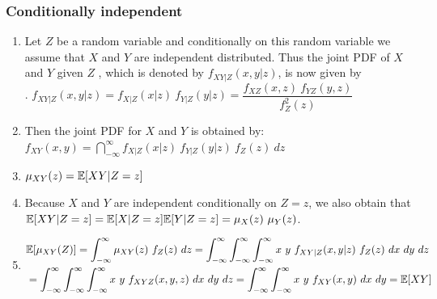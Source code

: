 \subsubsection{Conditionally independent}

\begin{enumerate}
    \item Let $Z$ be a random variable and conditionally on this random variable we assume that $X$ and $Y$ are independent distributed.
    Thus the joint PDF of $X$ and $Y$ given $Z$ , which is denoted by $f _{X Y |Z} (x, y|z)$, is now given by
    \hfill \cite{statistics/book/Statistics-for-Data-Scientists/Maurits-Kaptein}
    \\
    .\hfill
    $
        f_{X Y |Z} (x, y|z)
        = f _{X|Z} (x|z)\ f_{Y |Z} (y|z)
        = \dfrac{f_{X Z} (x, z)\ f_{Y Z} (y, z) } {f^2_Z (z)}
    $
    \hfill \cite{statistics/book/Statistics-for-Data-Scientists/Maurits-Kaptein}

    \item Then the joint PDF for $X$ and $Y$ is obtained by:
    $
        f _{X Y} (x, y)
        = \dint ^{\infty }_{-\infty} f_{X|Z} (x|z)\ f_{Y |Z} (y|z)\ f_Z (z)\ dz
    $
    \hfill \cite{statistics/book/Statistics-for-Data-Scientists/Maurits-Kaptein}

    \item $\mu_{X Y} (z) = \mathbb{E}[X Y |Z = z]$
    \hfill \cite{statistics/book/Statistics-for-Data-Scientists/Maurits-Kaptein}

    \item Because $X$ and $Y$ are independent conditionally on $Z = z$, we also obtain that $\mathbb{E}[X Y |Z = z] = \mathbb{E}[X|Z = z] \mathbb{E}[Y |Z = z] = \mu_X (z)\ \mu_Y (z)$. 
    \hfill \cite{statistics/book/Statistics-for-Data-Scientists/Maurits-Kaptein}

    \item 
    $
        \begin{aligned}
            &\mathbb{E}[\mu_{X Y }(Z )] 
            = \displaystyle\int^\infty_{-\infty} \mu_{X Y} (z)\ f_Z (z)\ dz
            = \displaystyle\int^\infty_{-\infty} \displaystyle\int^\infty_{-\infty} \displaystyle\int^\infty_{-\infty} x\ y\ f_{X Y |Z} (x, y|z)\ f_Z (z)\ dx\ dy\ dz \\
            &= \displaystyle\int^\infty_{-\infty} \displaystyle\int^\infty_{-\infty} \displaystyle\int^\infty_{-\infty} x\ y\ f_{X Y Z} (x, y, z)\ dx\ dy\ dz 
            = \displaystyle\int^\infty_{-\infty} \displaystyle\int^\infty_{-\infty} x\ y\ f_{X Y} (x, y)\ dx\ dy 
            = \mathbb{E}[X Y]
        \end{aligned}
    $
    \hfill \cite{statistics/book/Statistics-for-Data-Scientists/Maurits-Kaptein}


\end{enumerate}
